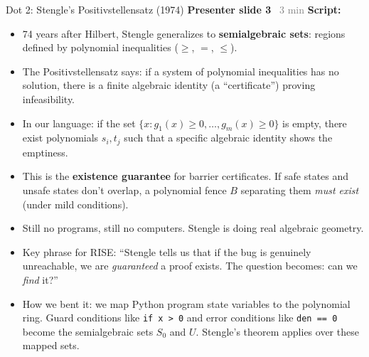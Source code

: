 \documentclass[aspectratio=169]{beamer}
\newcommand{\syncline}[2]{\textbf{#1} \hfill \textcolor{gray}{#2}}
\begin{document}

\begin{frame}{Dot 2: Stengle's Positivstellensatz (1974)}
\syncline{Presenter slide 3}{~3 min}
\textbf{Script:}
\begin{itemize}
  \item 74 years after Hilbert, Stengle generalizes to \textbf{semialgebraic sets}: regions defined by polynomial inequalities ($\ge$, $=$, $\le$).
  \item The Positivstellensatz says: if a system of polynomial inequalities has no solution, there is a finite algebraic identity (a ``certificate'') proving infeasibility.
  \item In our language: if the set $\{x : g_1(x) \ge 0, \ldots, g_m(x) \ge 0\}$ is empty, there exist polynomials $s_i, t_j$ such that a specific algebraic identity shows the emptiness.
  \item This is the \textbf{existence guarantee} for barrier certificates. If safe states and unsafe states don't overlap, a polynomial fence $B$ separating them \emph{must exist} (under mild conditions).
  \item Still no programs, still no computers. Stengle is doing real algebraic geometry.
  \item Key phrase for RISE: ``Stengle tells us that if the bug is genuinely unreachable, we are \emph{guaranteed} a proof exists. The question becomes: can we \emph{find} it?''
  \item How we bent it: we map Python program state variables to the polynomial ring. Guard conditions like \texttt{if x > 0} and error conditions like \texttt{den == 0} become the semialgebraic sets $S_0$ and $U$. Stengle's theorem applies over these mapped sets.
\end{itemize}
\end{frame}

\end{document}
